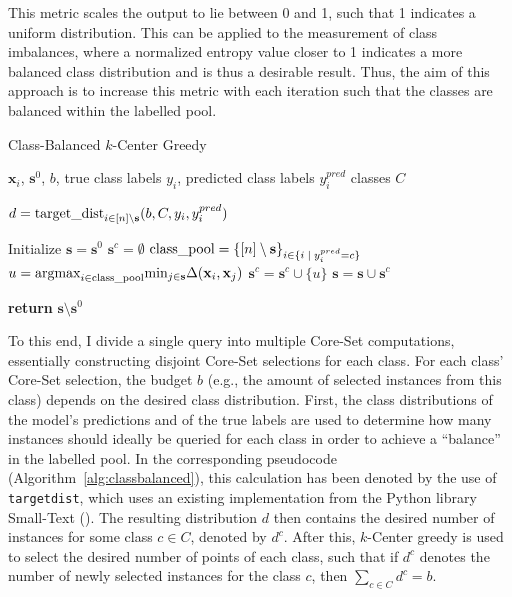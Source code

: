 \documentclass[english,bachelor,ul]{webisthesis} %
\begin{document}
This metric scales the output to lie between 0 and 1, such that 1 indicates a uniform distribution. This can be applied to the measurement of class imbalances, where a normalized entropy value closer to 1 indicates a more balanced class distribution and is thus a desirable result. Thus, the aim of this approach is to increase this metric with each iteration such that the classes are balanced within the labelled pool.

\begin{algorithm}
    \caption{Class-Balanced $k$-Center Greedy}%
\label{alg:classbalanced}
\begin{algorithmic}

\Require $ \mathbf{x}_i $, $ \mathbf{s}^0 $, $ b $, true class labels $ y_i $, predicted class labels $ y^{pred}_i $ classes $ C $

\State $ d = \text{target\textunderscore dist}_{i \in [n] \setminus \mathbf{s}} (b, C, y_i, y^{pred}_i) $

\State Initialize $ \mathbf{s} = \mathbf{s}^0 $
\State $ \mathbf{s}^c = \emptyset $
\State $ \text{class\textunderscore pool} = \{[n] \setminus \mathbf{s}\}_{i \in \{i \; | \; y_i^{pred} = c\}} $
\Repeat
\State $ u = \text{argmax}_{i \in \text{class\textunderscore pool}}\text{min}_{j \in \mathbf{s}} \Delta(\mathbf{x}_i, \mathbf{x}_j) $
\State $ \mathbf{s}^c = \mathbf{s}^c \cup \{u\} $
\State $ \mathbf{s} = \mathbf{s} \cup \mathbf{s}^c $
\EndFor

\State \textbf{return} $ \mathbf{s} \setminus \mathbf{s}^0 $
\end{algorithmic}
\end{algorithm}

To this end, I divide a single query into multiple Core-Set computations, essentially constructing disjoint Core-Set selections for each class. For each class' Core-Set selection, the budget $ b $ (e.g., the amount of selected instances from this class) depends on the desired class distribution. First, the class distributions of the model's predictions and of the true labels are used to determine how many instances should ideally be queried for each class in order to achieve a ``balance'' in the labelled pool. In the corresponding pseudocode (Algorithm~\ref{alg:classbalanced}), this calculation has been denoted by the use of \texttt{target\textunderscore dist}, which uses an existing implementation from the Python library Small-Text (\cite{schroeder2023small-text}). The resulting distribution $ d $ then contains the desired number of instances for some class $ c \in C $, denoted by $ d^c $. After this, $k$-Center greedy is used to select the desired number of points of each class, such that if $ d^c $ denotes the number of newly selected instances for the class $ c $, then $ \sum_{c \in C} d^c = b $. 
\end{document}
